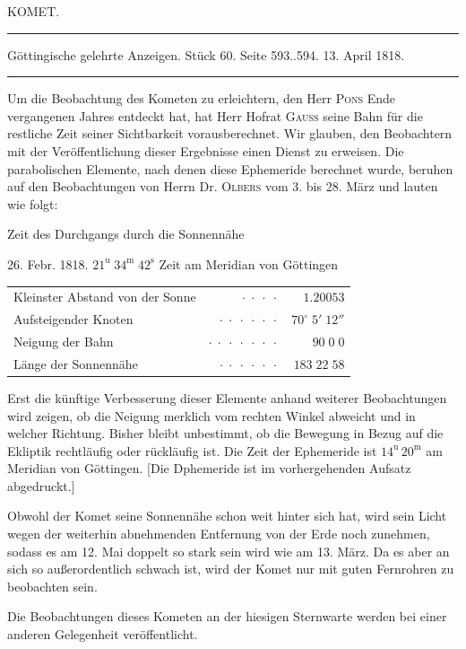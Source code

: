 \clearpage{}\hypertarget{native-408-part-lower}{}\label{native-408-part-lower}
\begin{center}\large KOMET.\end{center}
\begin{center}\hrule\vspace{4pt}\fontsize{10}{12}\selectfont Göttingische gelehrte Anzeigen. Stück 60. Seite 593..594. 13. April 1818.\par\vspace{4pt}\hrule\vspace{4pt}\end{center}
\par\indent Um die Beobachtung des Kometen zu erleichtern, den Herr \textsc{Pons} Ende vergangenen Jahres entdeckt hat, hat Herr Hofrat \textsc{Gauss} seine Bahn für die restliche Zeit seiner Sichtbarkeit vorausberechnet. Wir glauben, den Beobachtern mit der Veröffentlichung dieser Ergebnisse einen Dienst zu erweisen. Die parabolischen Elemente, nach denen diese Ephemeride berechnet wurde, beruhen auf den Beobachtungen von Herrn Dr. \textsc{Olbers} vom 3. bis 28. März und lauten wie folgt:

\begin{center}\fontsize{10}{12}\selectfont
Zeit des Durchgangs durch die Sonnennähe
\par 26. Febr. 1818. $21^{\mathrm u}\;34^{\mathrm m}\;42^{\mathrm s}$ Zeit am Meridian von Göttingen
\par\smallskip\begin{tabular}{lrr}
Kleinster Abstand von der Sonne & $\cdot\;\cdot\;\cdot\;\cdot$ & $1.20053$\\
Aufsteigender Knoten & $\cdot\;\cdot\;\cdot\;\cdot\;\cdot\;\cdot$ & $70^\circ\;5'\;12''$\\
Neigung der Bahn & $\cdot\;\cdot\;\cdot\;\cdot\;\cdot\;\cdot\;\cdot$ & $90\;0\;0$\\
Länge der Sonnennähe & $\cdot\;\cdot\;\cdot\;\cdot\;\cdot\;\cdot$ & $183\;22\;58$\\
\end{tabular}\end{center}

\par\indent Erst die künftige Verbesserung dieser Elemente anhand weiterer Beobachtungen wird zeigen, ob die Neigung merklich vom rechten Winkel abweicht und in welcher Richtung. Bisher bleibt unbestimmt, ob die Bewegung in Bezug auf die Ekliptik rechtläufig oder rückläufig ist. Die Zeit der Ephemeride ist $14^{\mathrm u}\,20^{\mathrm m}$ am Meridian von Göttingen. [Die Dphemeride ist im vorhergehenden Aufsatz abgedruckt.]

\par\indent Obwohl der Komet seine Sonnennähe schon weit hinter sich hat, wird sein Licht wegen der weiterhin abnehmenden Entfernung von der Erde noch zunehmen, sodass es am 12. Mai doppelt so stark sein wird wie am 13. März. Da es aber an sich so außerordentlich schwach ist, wird der Komet nur mit guten Fernrohren zu beobachten sein.

\par\indent Die Beobachtungen dieses Kometen an der hiesigen Sternwarte werden bei einer anderen Gelegenheit veröffentlicht.
